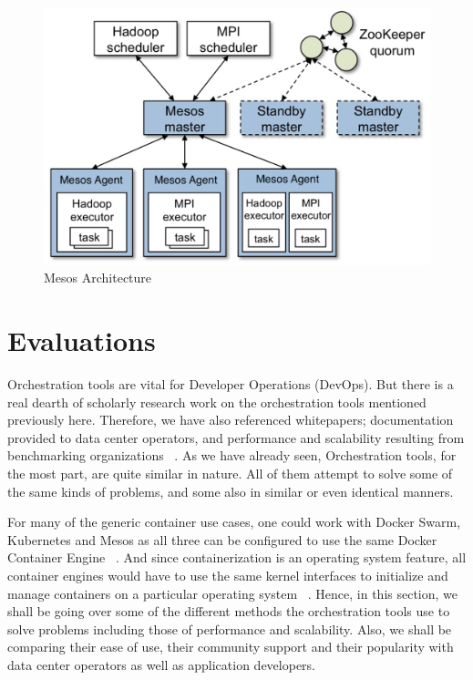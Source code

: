 \documentclass[10pt,twocolumn]{article}
\begin{document}
\begin{figure}
  \centering
    \includegraphics[width=\textwidth]{mesos}
    \caption{Mesos Architecture ~\cite{mesos}}
  \label{overflow}
\end{figure}

\section{Evaluations}

Orchestration tools are vital for Developer Operations (DevOps).
But there is a real dearth of scholarly research work on the orchestration tools mentioned previously here.
Therefore, we have also referenced whitepapers; documentation provided to data center operators,  and performance and scalability resulting from benchmarking organizations ~\cite{orchestration}.
As we have already seen, Orchestration tools, for the most part, are quite similar in nature.
All of them attempt to solve some of the same kinds of problems, and some also in similar or even identical manners.

For many of the generic container use cases, one could work with Docker Swarm, Kubernetes and Mesos as all three can be configured to use the same Docker Container Engine ~\cite{docker_swarm, kubernetes, mesos}.
And since containerization is an operating system feature, all container engines would have to use the same kernel interfaces to initialize and manage containers on a particular operating system ~\cite{intro_containerisation}.
Hence, in this section, we shall be going over some of the different methods the orchestration tools use to solve problems including those of performance and scalability.
Also, we shall be comparing their ease of use, their community support and their popularity with data center operators as well as application developers.
\end{document}
